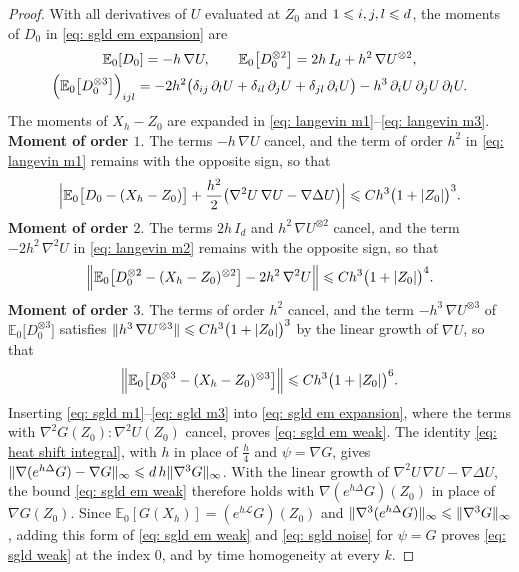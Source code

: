 \begin{proof}
    With all derivatives of $U$ evaluated at $Z_0$ and $1 \leqslant i,j,l \leqslant d$, the moments of $D_0$ in \eqref{eq: sgld em expansion} are
    \begin{equation*}
    \begin{gathered}
        \mathbb E_0[D_0] = -h\, \nabla U , \qquad \mathbb E_0\bigl[ D_0^{\otimes 2} \bigr] = 2h\, I_d + h^2\, \nabla U^{\otimes 2} , \\
        \Bigl( \mathbb E_0\bigl[ D_0^{\otimes 3} \bigr] \Bigr)_{ijl} = -2h^2 \bigl( \delta_{ij}\, \partial_l U + \delta_{il}\, \partial_j U + \delta_{jl}\, \partial_i U \bigr) - h^3\, \partial_i U\, \partial_j U\, \partial_l U .
    \end{gathered}
    \end{equation*}
    The moments of $X_h - Z_0$ are expanded in \eqref{eq: langevin m1}--\eqref{eq: langevin m3}.\\[6pt]
    \textbf{Moment of order $1$}. The terms $-h\, \nabla U$ cancel, and the term of order $h^2$ in \eqref{eq: langevin m1} remains with the opposite sign, so that
    \begin{equation}
        \Bigl| \mathbb E_0\bigl[ D_0 - (X_h - Z_0) \bigr] + \frac{h^2}{2} \bigl( \nabla^2 U\, \nabla U - \nabla \Delta U \bigr) \Bigr| \leqslant C h^3 \bigl( 1 + |Z_0| \bigr)^3 .
        \label{eq: sgld m1}
    \end{equation}
    \textbf{Moment of order $2$}. The terms $2h\, I_d$ and $h^2\, \nabla U^{\otimes 2}$ cancel, and the term $-2h^2\, \nabla^2 U$ in \eqref{eq: langevin m2} remains with the opposite sign, so that
    \begin{equation}
        \Bigl\| \mathbb E_0\bigl[ D_0^{\otimes 2} - (X_h - Z_0)^{\otimes 2} \bigr] - 2h^2\, \nabla^2 U \Bigr\| \leqslant C h^3 \bigl( 1 + |Z_0| \bigr)^4 .
        \label{eq: sgld m2}
    \end{equation}
    \textbf{Moment of order $3$}. The terms of order $h^2$ cancel, and the term $-h^3\, \nabla U^{\otimes 3}$ of $\mathbb E_0\bigl[ D_0^{\otimes 3} \bigr]$ satisfies $\lVert h^3\, \nabla U^{\otimes 3} \rVert \leqslant C h^3 \bigl( 1 + |Z_0| \bigr)^3$ by the linear growth of $\nabla U$, so that
    \begin{equation}
        \Bigl\| \mathbb E_0\bigl[ D_0^{\otimes 3} - (X_h - Z_0)^{\otimes 3} \bigr] \Bigr\| \leqslant C h^3 \bigl( 1 + |Z_0| \bigr)^6 .
        \label{eq: sgld m3}
    \end{equation}
    Inserting \eqref{eq: sgld m1}--\eqref{eq: sgld m3} into \eqref{eq: sgld em expansion}, where the terms with $\nabla^2 G(Z_0) : \nabla^2 U(Z_0)$ cancel, proves \eqref{eq: sgld em weak}. The identity \eqref{eq: heat shift integral}, with $h$ in place of $\frac h4$ and $\psi = \nabla G$, gives $\lVert \nabla ( e^{h\Delta} G ) - \nabla G \rVert_\infty \leqslant d\, h \lVert \nabla^3 G \rVert_\infty$. With the linear growth of $\nabla^2 U\, \nabla U - \nabla \Delta U$, the bound \eqref{eq: sgld em weak} therefore holds with $\nabla ( e^{h\Delta} G )(Z_0)$ in place of $\nabla G(Z_0)$. Since $\mathbb E_0[G(X_h)] = (e^{h\mathcal L} G)(Z_0)$ and $\lVert \nabla^3 ( e^{h\Delta} G ) \rVert_\infty \leqslant \lVert \nabla^3 G \rVert_\infty$, adding this form of \eqref{eq: sgld em weak} and \eqref{eq: sgld noise} for $\psi = G$ proves \eqref{eq: sgld weak} at the index $0$, and by time homogeneity at every $k$.

\end{proof}
